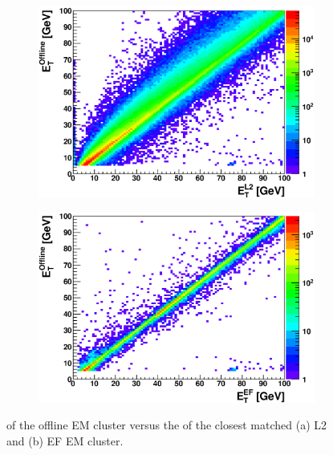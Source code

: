  
\begin{figure}
\centering
        \begin{subfigure}[b]{0.5\textwidth}
                \centering
                \includegraphics[width=\textwidth]{figures/ServiceWork/run_190644/EtEt_Matched_L2.eps}
        \end{subfigure}%
        \begin{subfigure}[b]{0.5\textwidth}
                \centering
                \includegraphics[width=\textwidth]{figures/ServiceWork/run_190644/EtEt_Matched_EF.eps}
        \end{subfigure}%
\caption[Offline EM \et{} versus L2 and EF EM \et{}]{
\et{} of the offline EM cluster versus the \et{} of the closest matched (a) L2 and (b) EF EM cluster.
\label{SW_egamma_L2EF_EtEt}}
\end{figure}

